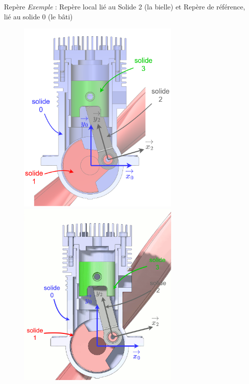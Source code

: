 \documentclass[
  ignorenonframetext,
  aspectratio=169,
  c]{beamer}
\begin{document}
\begin{frame}{Repère}
\label{repuxe8re-1}
\emph{Exemple} : Repère local lié au Solide 2 (la bielle) et Repère de
référence, lié au solide 0 (le bâti)

\begin{figure}

\begin{minipage}{0.50\linewidth}
\begin{center}
\includegraphics[width=0.7\textwidth,height=\textheight]{CM3/Repere-01.png}
\end{center}
\end{minipage}%
%
\begin{minipage}{0.50\linewidth}
\begin{center}
\includegraphics[width=0.7\textwidth,height=\textheight]{CM3/Repere-02.gif}
\end{center}
\end{minipage}%

\end{figure}%
\end{frame}
\end{document}
